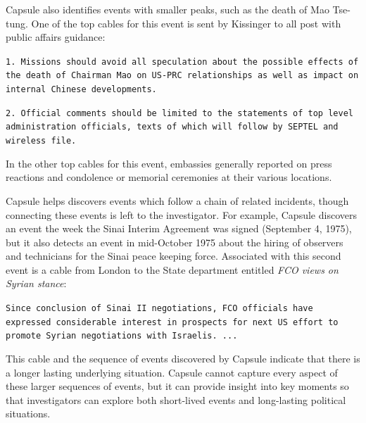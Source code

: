 Capsule also identifies events with smaller peaks, such as the death of Mao Tse-tung.  One of the top cables for this event is sent by Kissinger to all post with public affairs guidance: %
\begin{shaded*} \tt{1.  Missions should avoid all speculation about the 
possible effects of the death of Chairman Mao on
US-PRC relationships as well as impact on internal
Chinese developments.}

\tt{2.  Official comments should be limited to the statements
of top level administration officials, texts of which
will follow by SEPTEL and wireless file.}
\end{shaded*}
\noindent In the other top cables for this event, embassies generally reported on press reactions and condolence or memorial ceremonies at their various locations.

Capsule helps discovers events which follow a chain of related incidents, though connecting these events is left to the investigator.  For example, Capsule discovers an event the week the Sinai Interim Agreement was signed (September 4, 1975), but it also detects an event in mid-October 1975 about the hiring of observers and technicians for the Sinai peace keeping force.  Associated with this second event is a cable from London to the State department entitled \emph{FCO views on Syrian stance}:
\begin{shaded*} \tt{Since conclusion of Sinai II negotiations, FCO
officials have expressed considerable interest in prospects
for next US effort to promote Syrian negotiations with Israelis. ...}
\end{shaded*}
\noindent This cable and the sequence of events discovered by Capsule indicate that there is a longer lasting underlying situation.  Capsule cannot capture every aspect of these larger sequences of events, but it can provide insight into key moments so that investigators can explore both short-lived events and long-lasting political situations.

